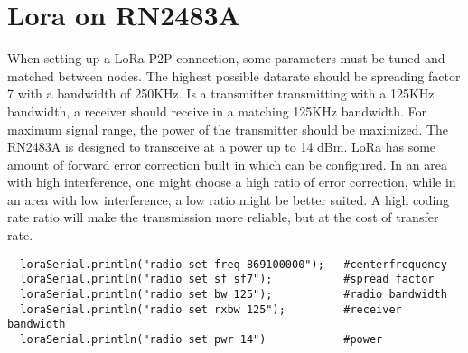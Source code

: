 \section{Lora on RN2483A}

When setting up a LoRa P2P connection, some parameters must be tuned and matched between nodes. The highest possible datarate should be spreading factor 7 with a bandwidth of 250KHz\cite{regparam}. Is a transmitter transmitting with a 125KHz bandwidth, a receiver should receive in a matching 125KHz bandwidth. For maximum signal range, the power of the transmitter should be maximized. The RN2483A is designed to transceive at a power up to 14 dBm. LoRa has some amount of forward error correction built in which can be configured. In an area with high interference, one might choose a high ratio of error correction, while in an area with low interference, a low ratio might be better suited. A high coding rate ratio will make the transmission more reliable, but at the cost of transfer rate\cite{understandingparams}.
\begin{lstlisting}
  loraSerial.println("radio set freq 869100000");   #centerfrequency
  loraSerial.println("radio set sf sf7");           #spread factor
  loraSerial.println("radio set bw 125");           #radio bandwidth
  loraSerial.println("radio set rxbw 125");         #receiver bandwidth
  loraSerial.println("radio set pwr 14")            #power
\end{lstlisting}
